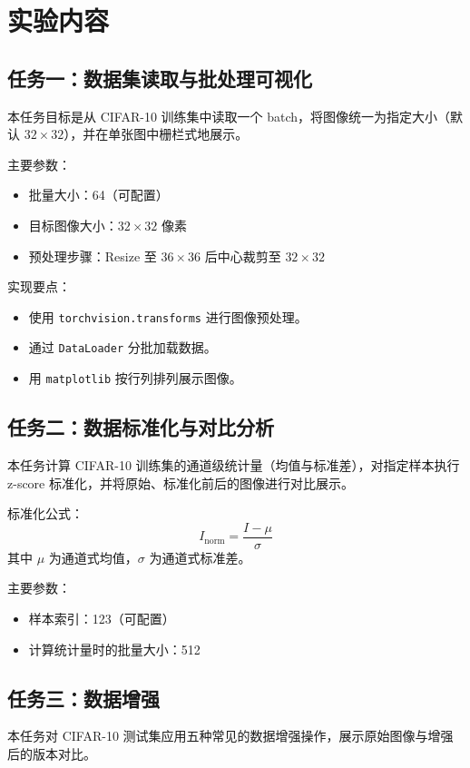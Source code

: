 \documentclass[12pt,a4paper]{ctexart}
\begin{document}
\section{实验内容}
\subsection{任务一：数据集读取与批处理可视化}
本任务目标是从 CIFAR-10 训练集中读取一个 batch，将图像统一为指定大小（默认 $32\times 32$），并在单张图中栅栏式地展示。

主要参数：
\begin{itemize}
  \item 批量大小：64（可配置）
  \item 目标图像大小：$32\times 32$ 像素
  \item 预处理步骤：Resize 至 $36\times 36$ 后中心裁剪至 $32\times 32$
\end{itemize}

实现要点：
\begin{itemize}
  \item 使用 \texttt{torchvision.transforms} 进行图像预处理。
  \item 通过 \texttt{DataLoader} 分批加载数据。
  \item 用 \texttt{matplotlib} 按行列排列展示图像。
\end{itemize}

\subsection{任务二：数据标准化与对比分析}
本任务计算 CIFAR-10 训练集的通道级统计量（均值与标准差），对指定样本执行 z-score 标准化，并将原始、标准化前后的图像进行对比展示。

标准化公式：
\begin{equation}
I_{\text{norm}} = \frac{I - \mu}{\sigma}
\end{equation}
其中 $\mu$ 为通道式均值，$\sigma$ 为通道式标准差。

主要参数：
\begin{itemize}
  \item 样本索引：123（可配置）
  \item 计算统计量时的批量大小：512
\end{itemize}

\subsection{任务三：数据增强}
本任务对 CIFAR-10 测试集应用五种常见的数据增强操作，展示原始图像与增强后的版本对比。
\end{document}
